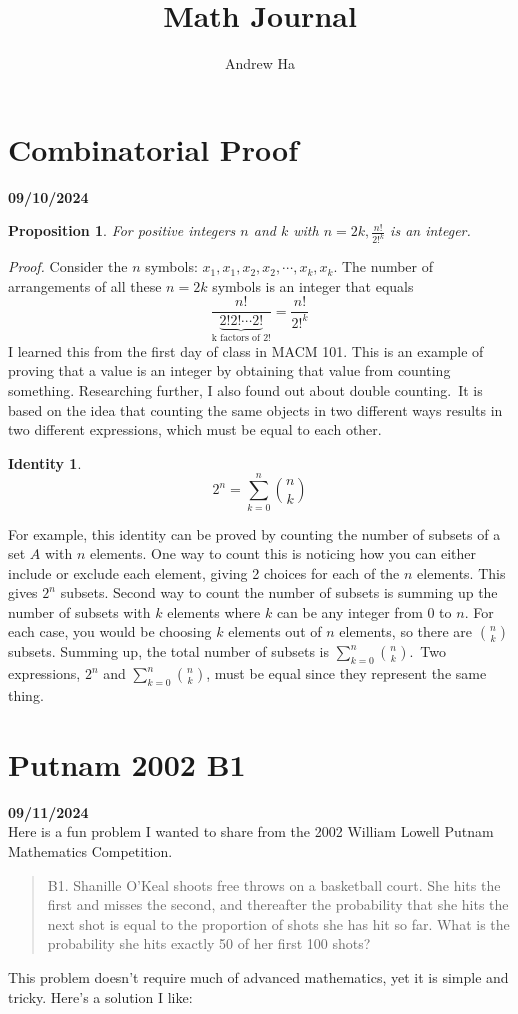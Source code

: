 \documentclass[12pt, oneside]{article}
\title{Math Journal}
\author{Andrew Ha}
\date{}								%
\newtheorem{proposition}{Proposition}
\newtheorem{identity}{Identity}
\begin{document}
\maketitle
\section*{Combinatorial Proof}
\textbf{09/10/2024}
\begin{proposition} For positive integers $n$ and $k$ with $n=2k, \frac{n!}{2!^k}$ is an integer. \end{proposition}
\emph{Proof.}  Consider the $n$ symbols: $x_1, x_1, x_2, x_2, \cdots, x_k, x_k$.
The number of arrangements of all these $n = 2k$ symbols is an integer that equals
\[
\frac{n!}{\underbrace{2! 2! \cdots 2!}_{\text{k factors of 2!}}} = \frac{n!}{2!^k}
\]
I learned this from the first day of class in MACM 101. This is an example of proving that a value is an integer by obtaining that value from counting something. Researching further, I also found out about double counting.\ It is based on the idea that counting the same objects in two different ways results in two different expressions, which must be equal to each other. 
\begin{identity}
\[
2^n = \sum_{k=0}^{n}  \binom{n}{k}
\]
\end{identity}
For example, this identity can be proved by counting the number of subsets of a set $A$ with $n$ elements. One way to count this is noticing how you can either include or exclude each element, giving 2 choices for each of the $n$ elements. This gives $2^n$ subsets. Second way to count the number of subsets is summing up the number of subsets with $k$ elements where $k$ can be any integer from 0 to $n$. For each case, you would be choosing $k$ elements out of $n$ elements, so there are $\binom{n}{k}$ subsets.
Summing up, the total number of subsets is $\sum_{k=0}^{n}  \binom{n}{k}$.\ Two expressions, $2^n$ and $\sum_{k=0}^{n}  \binom{n}{k}$, must be equal since they represent the same thing.
\section*{Putnam 2002 B1}
\textbf{09/11/2024}
\\
\noindent Here is a fun problem I wanted to share from the 2002 William Lowell Putnam Mathematics Competition.
\begin{quote}
B1. Shanille O'Keal shoots free throws on a basketball court. She hits
the first and misses the second, and thereafter the probability that
she hits the next shot is equal to the proportion of shots she
has hit so far. What is the probability she hits exactly 50 of
her first 100 shots?
\end{quote}
This problem doesn't require much of advanced mathematics, yet it is simple and tricky. Here's a solution I like:\\
\end{document}
